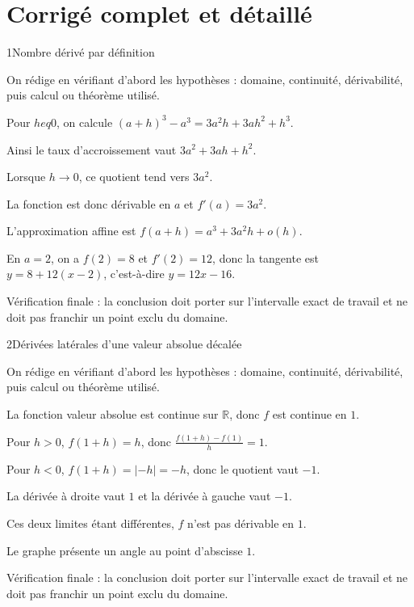 \documentclass[11pt,a4paper]{article}
\newcommand{\R}{\mathbb{R}}
\begin{document}
\section{Corrigé complet et détaillé}
\begin{corrbox}{1}{Nombre dérivé par définition}

\begin{methodebox}
On rédige en vérifiant d'abord les hypothèses : domaine, continuité, dérivabilité, puis calcul ou théorème utilisé.
\end{methodebox}

Pour $h
eq0$, on calcule $(a+h)^3-a^3=3a^2h+3ah^2+h^3$.


Ainsi le taux d'accroissement vaut $3a^2+3ah+h^2$.


Lorsque $h\to0$, ce quotient tend vers $3a^2$.


La fonction est donc dérivable en $a$ et $f'(a)=3a^2$.


L'approximation affine est $f(a+h)=a^3+3a^2h+o(h)$.


En $a=2$, on a $f(2)=8$ et $f'(2)=12$, donc la tangente est $y=8+12(x-2)$, c'est-à-dire $y=12x-16$.


\begin{attentionbox}
Vérification finale : la conclusion doit porter sur l'intervalle exact de travail et ne doit pas franchir un point exclu du domaine.
\end{attentionbox}

\end{corrbox}


\begin{corrbox}{2}{Dérivées latérales d'une valeur absolue décalée}

\begin{methodebox}
On rédige en vérifiant d'abord les hypothèses : domaine, continuité, dérivabilité, puis calcul ou théorème utilisé.
\end{methodebox}

La fonction valeur absolue est continue sur $\R$, donc $f$ est continue en $1$.


Pour $h>0$, $f(1+h)=h$, donc $\frac{f(1+h)-f(1)}{h}=1$.


Pour $h<0$, $f(1+h)=|-h|=-h$, donc le quotient vaut $-1$.


La dérivée à droite vaut $1$ et la dérivée à gauche vaut $-1$.


Ces deux limites étant différentes, $f$ n'est pas dérivable en $1$.


Le graphe présente un angle au point d'abscisse $1$.


\begin{attentionbox}
Vérification finale : la conclusion doit porter sur l'intervalle exact de travail et ne doit pas franchir un point exclu du domaine.
\end{attentionbox}

\end{corrbox}
\end{document}

